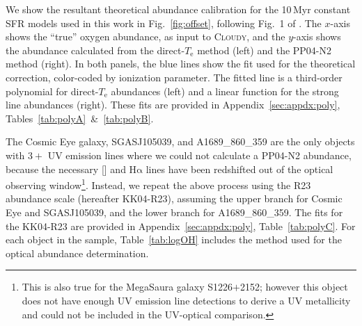 \documentclass[trackchanges, preprint2]{aastex62}
\newcommand{\Cloudy}{\textsc{Cloudy}\xspace}
\newcommand{\ha}{\ensuremath{\mathrm{H\alpha}}\xspace}
\newcommand{\Myr}{$\,$Myr\xspace}
\newcommand{\mage}{{\sc Meg}a{\sc S}a{\sc ura}\xspace}
\newcommand{\Te}{\ensuremath{T_{\mathrm{e}}}\xspace}
\begin{document}
We show the resultant theoretical abundance calibration for the 10\Myr constant SFR models used in this work in Fig.~\ref{fig:offset}, following Fig.~1 of \citet{Stasinska+2005}. The $x$-axis shows the ``true'' oxygen abundance, as input to \Cloudy, and the $y$-axis shows the abundance calculated from the direct-\Te method (left) and the PP04-N2 method (right). In both panels, the blue lines show the fit used for the theoretical correction, color-coded by ionization parameter. The fitted line is a third-order polynomial for direct-\Te abundances (left) and a linear function for the strong line abundances (right). These fits are provided in Appendix~\ref{sec:appdx:poly}, Tables~\ref{tab:polyA}~\&~\ref{tab:polyB}.

The Cosmic Eye galaxy, SGASJ105039, and A1689\_860\_359 are the only objects with $3+$ UV emission lines where we could not calculate a PP04-N2 abundance, because the necessary [] and \ha lines have been redshifted out of the optical observing window\footnote{This is also true for the \mage galaxy S1226$+$2152; however this object does not have enough UV emission line detections to derive a UV metallicity and could not be included in the UV-optical comparison.}. Instead, we repeat the above process using the \citet{Kobulnicky+2004} R23 abundance scale (hereafter KK04-R23), assuming the upper branch for Cosmic Eye and SGASJ105039, and the lower branch for A1689\_860\_359. The fits for the KK04-R23 are provided in Appendix~\ref{sec:appdx:poly}, Table~\ref{tab:polyC}. For each object in the sample, Table~\ref{tab:logOH} includes the method used for the optical abundance determination.

\end{document}
